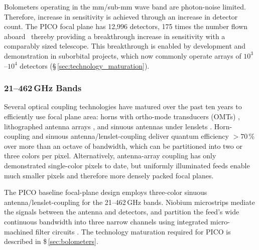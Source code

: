 
Bolometers operating in the mm/sub-mm wave band are photon-noise limited. Therefore, increase in sensitivity is achieved through an increase in detector count. The PICO focal plane has 12,996 detectors, 175 times the number flown aboard \planck\ thereby providing a breakthrough increase in sensitivity with a comparably sized telescope. This breakthrough is enabled by development and demonstration in suborbital projects, which now commonly operate arrays of $10^3$--$10^4$ detectors (\S\,\ref{sec:technology_maturation}).

\subsubsection{21--462\,GHz Bands}
\label{sec:low_freq_det} %
%


Several optical coupling technologies have matured over the past ten
years to efficiently use focal plane area: horns with ortho-mode
transducers (OMTs) \citep{Duff2016}, lithographed antenna arrays
\citep{BICEP2015}, and sinuous antennas under lenslets
\citep{Edwards2012}. Horn-coupling and sinuous
antenna/lenslet-coupling deliver quantum efficiency $>70\,\%$ over
more than an octave of bandwidth, which can be partitioned into two
or three colors per pixel.  Alternatively, antenna-array coupling has
only demonstrated single-color pixels to date, but uniformly
illuminated feeds enable much smaller pixels and therefore more
densely packed focal planes.


The PICO baseline focal-plane design
employs three-color sinuous antenna/lenslet-coupling \citep{Suzuki2014}
for the 21--462\,GHz bands. Niobium microstrips mediate the signals
between the antenna and detectors, and partition the feed's wide
continuous bandwidth into three narrow channels using integrated
micro-machined filter circuits \citep{OBrient2013}. The technology
maturation required for PICO is described in \$\,\ref{sec:bolometers}.

